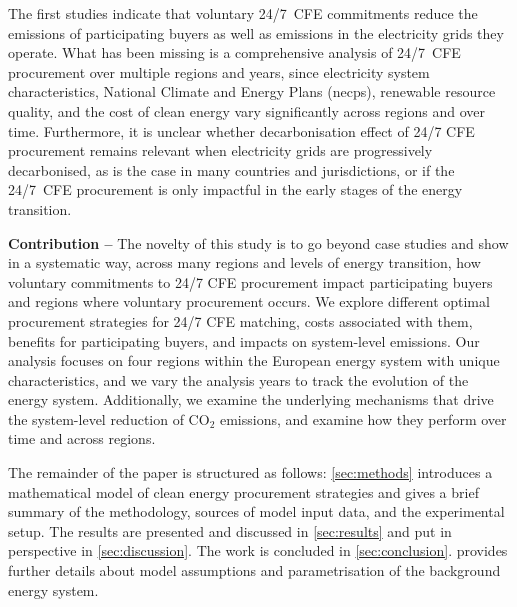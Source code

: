 The first studies indicate that voluntary 24/7~CFE commitments reduce the emissions of participating buyers as well as emissions in the electricity grids they operate.
What has been missing is a comprehensive analysis of 24/7~CFE procurement over multiple regions and years, since electricity system characteristics, National Climate and Energy Plans (\gls{necp}s), renewable resource quality, and the cost of clean energy vary significantly across regions and over time.
Furthermore, it is unclear whether decarbonisation effect of 24/7 CFE procurement remains relevant when electricity grids are progressively decarbonised, as is the case in many countries and jurisdictions, or if the 24/7~CFE procurement is only impactful in the early stages of the energy transition.


\textbf{Contribution --} The novelty of this study is to go beyond case studies and show in a systematic way, across many regions and levels of energy transition, how voluntary commitments to 24/7 CFE procurement impact participating buyers and regions where voluntary procurement occurs.
We explore different optimal procurement strategies for 24/7 CFE matching, costs associated with them, benefits for participating buyers, and impacts on system-level emissions.
Our analysis focuses on four regions within the European energy system with unique characteristics, and we vary the analysis years to track the evolution of the energy system.
Additionally, we examine the underlying mechanisms that drive the system-level reduction of CO$_2$ emissions, and examine how they perform over time and across regions.


The remainder of the paper is structured as follows: \cref{sec:methods} introduces a mathematical model of clean energy procurement strategies and gives a brief summary of the methodology, sources of model input data, and the experimental setup.
The results are presented and discussed in \cref{sec:results} and put in perspective in \cref{sec:discussion}.
The work is concluded in \cref{sec:conclusion}.
 provides further details about model assumptions and parametrisation of the background energy system.